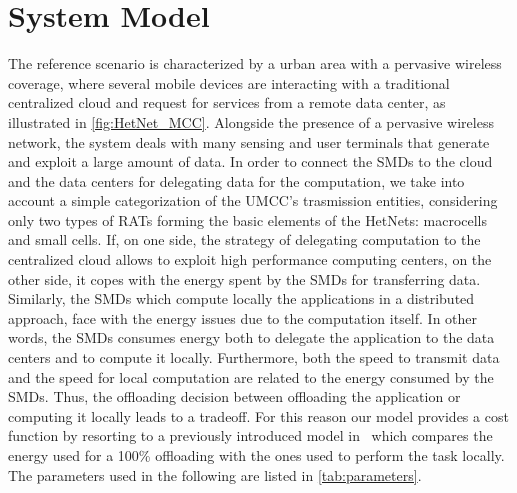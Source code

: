 \documentclass[twoside,openright]{report}
\begin{document}
\section{System Model}
The reference scenario is characterized by a urban area with a pervasive wireless coverage, where several mobile devices are interacting with a traditional centralized cloud and request for services from a remote data center, as illustrated in \autoref{fig:HetNet_MCC}.
Alongside the presence of a pervasive wireless network, the system deals with many sensing and user terminals that generate and exploit a large amount of data.
In order to connect the \glspl{SMD} to the cloud and the data centers for delegating data for the computation, we take into account a simple categorization of the \gls{UMCC}'s trasmission entities, considering only two types of \glspl{RAT} forming the basic elements of the \glspl{HetNet}: macrocells and small cells.
If, on one side, the strategy of delegating computation to the centralized cloud allows to exploit high performance computing centers, on the other side, 
it copes with the energy spent by the \glspl{SMD} for transferring data. 
Similarly, the \glspl{SMD} which compute locally the applications in a distributed approach, face with the energy issues due to the computation itself.
In other words, the \glspl{SMD} consumes energy  both to delegate the application to the data centers and to compute it locally.  Furthermore, both the speed to transmit data and the speed for local computation are related to the energy consumed by the \glspl{SMD}. Thus, the offloading decision between offloading the application or computing it locally leads to a tradeoff. 
For this reason our model provides a cost function by resorting to a previously introduced model in~\cite{Kumar,Tradeoff} which compares the energy used for a 100\% offloading with the ones used to perform the task locally. The parameters used in the following are listed in \autoref{tab:parameters}. 
\end{document}
